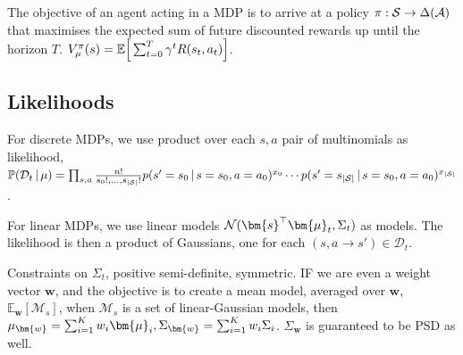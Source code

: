 The objective of an agent acting in a MDP is to arrive at a policy $\pi : \mathcal{S} \rightarrow \Delta(\mathcal{A})$ that maximises the expected sum of future discounted rewards up until the horizon $T$. $V_\mu^\pi(s) = \mathbb{E}\Big[\sum_{t=0}^T \gamma^t R(s_t, a_t)\Big]$.

\subsection{Likelihoods}

For discrete MDPs, we use product over each $s, a$ pair of multinomials as likelihood, $\mathbb{P}(\mathcal{D}_t \, | \, \mu) = \prod_{s,a}\frac{n!}{s_0!, ..., s_{|\mathcal{S}|}!}p(s' = s_0 \, | \, s=s_0, a=a_0)^{x_0}\\ \cdots p(s' = s_{|\mathcal{S}|} \, | \, s=s_0, a=a_0)^{x_{|\mathcal{S}|}}$.

For linear MDPs, we use linear models $\mathcal{N}(\bm{s}^\top\bm{\mdp}_t, \Sigma_t)$ as models. The likelihood is then a product of Gaussians, one for each $(s, a \rightarrow s') \in \mathcal{D}_t$.

Constraints on $\Sigma_t$, positive semi-definite, symmetric. IF we are even a weight vector $\bm{w}$, and the objective is to create a mean model, averaged over $\bm{w}$, $\mathbb{E}_{\bm{w}}[\mathcal{M}_s]$, when $\mathcal{M}_s$ is a set of linear-Gaussian models, then $\mdp_{\bm{w}} = \sum_{i=1}^K w_i \bm{\mdp}_i, \Sigma_{\bm{w}} = \sum_{i=1}^K w_i \Sigma_i$. $\Sigma_{\bm{w}}$ is guaranteed to be PSD as well.

